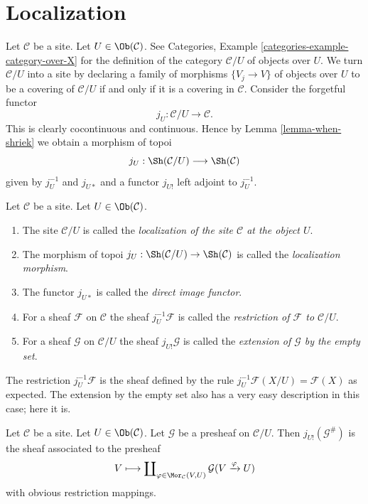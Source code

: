 







\section{Localization}
\label{section-localize}

\noindent
Let $\mathcal{C}$ be a site.
Let $U \in \Ob(\mathcal{C})$.
See
Categories, Example \ref{categories-example-category-over-X}
for the definition of the category $\mathcal{C}/U$ of
objects over $U$. We turn $\mathcal{C}/U$ into a site
by declaring a family of morphisms $\{V_j \to V\}$ of
objects over $U$ to be a covering of $\mathcal{C}/U$
if and only if it is a covering in $\mathcal{C}$.
Consider the forgetful functor
$$
j_U : \mathcal{C}/U \longrightarrow \mathcal{C}.
$$
This is clearly cocontinuous and continuous. Hence by
Lemma \ref{lemma-when-shriek} we obtain a morphism of topoi
$$
j_U : \Sh(\mathcal{C}/U) \longrightarrow \Sh(\mathcal{C})
$$
given by $j_U^{-1}$ and $j_{U*}$ and a functor $j_{U!}$
left adjoint to $j_U^{-1}$.

\begin{definition}
\label{definition-localize}
Let $\mathcal{C}$ be a site.
Let $U \in \Ob(\mathcal{C})$.
\begin{enumerate}
\item The site $\mathcal{C}/U$ is called the {\it localization of
the site $\mathcal{C}$ at the object $U$}.
\item The morphism of topoi
$j_U : \Sh(\mathcal{C}/U) \to \Sh(\mathcal{C})$
is called the {\it localization morphism}.
\item The functor $j_{U*}$ is called the {\it direct image functor}.
\item For a sheaf $\mathcal{F}$ on $\mathcal{C}$ the sheaf
$j_U^{-1}\mathcal{F}$ is called the {\it restriction of $\mathcal{F}$
to $\mathcal{C}/U$}.
\item For a sheaf $\mathcal{G}$ on $\mathcal{C}/U$
the sheaf $j_{U!}\mathcal{G}$ is called the
{\it extension of $\mathcal{G}$ by the empty set}.
\end{enumerate}
\end{definition}

\noindent
The restriction $j_U^{-1}\mathcal{F}$ is the sheaf
defined by the rule $j_U^{-1}\mathcal{F}(X/U) = \mathcal{F}(X)$ as expected.
The extension by the empty set also has a very easy description in
this case; here it is.

\begin{lemma}
\label{lemma-describe-j-shriek}
Let $\mathcal{C}$ be a site.
Let $U \in \Ob(\mathcal{C})$.
Let $\mathcal{G}$ be a presheaf on $\mathcal{C}/U$.
Then $j_{U!}(\mathcal{G}^\#)$ is the sheaf associated to the presheaf
$$
V
\longmapsto
\coprod\nolimits_{\varphi \in \Mor_\mathcal{C}(V, U)}
\mathcal{G}(V \xrightarrow{\varphi} U)
$$
with obvious restriction mappings.
\end{lemma}


